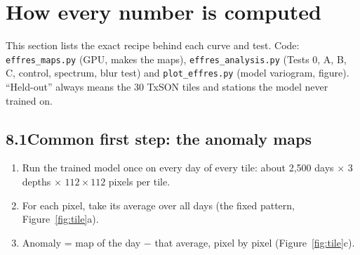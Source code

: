 \documentclass[11pt,a4paper]{article}
\begin{document}
\clearpage
\section{How every number is computed}

This section lists the exact recipe behind each curve and test. Code: \texttt{effres\_maps.py} (GPU, makes the
maps), \texttt{effres\_analysis.py} (Tests 0, A, B, C, control, spectrum, blur test) and \texttt{plot\_effres.py}
(model variogram, figure). ``Held-out'' always means the 30 TxSON tiles and stations the model never trained on.

\subsection*{8.1\quad Common first step: the anomaly maps}
\begin{enumerate}
\item Run the trained model once on every day of every tile: about 2{,}500 days $\times$ 3 depths $\times$ $112 \times 112$ pixels per tile.
\item For each pixel, take its average over all days (the fixed pattern, Figure~\ref{fig:tile}a).
\item Anomaly = map of the day $-$ that average, pixel by pixel (Figure~\ref{fig:tile}c).
\end{enumerate}
\end{document}
